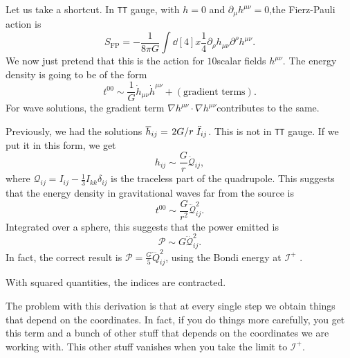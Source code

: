 Let us take a shortcut. In \texttt{TT} gauge, with $h = 0$ and $\partial_{\mu} h^{\mu\nu} = 0$,the Fierz-Pauli action is 
\begin{equation}
  S_{\text{FP}} = -\frac{1}{8 \pi G} \int \dd[4]{x} \frac{1}{4} \partial_{\rho} h_{\mu\nu} \partial^{\rho} h^{\mu\nu}.
\end{equation}
We now just pretend that this is the action for $10$scalar fields $h^{\mu\nu}$.
The energy density is going to be of the form
\begin{equation}
  t^{00} \sim \frac{1}{G} \dot{h}_{\mu\nu} \dot{h}^{\mu\nu} + (\text{gradient terms}).
\end{equation}
For wave solutions, the gradient term $\nabla h^{\mu\nu} \cdot \nabla h^{\mu\nu}$contributes to the same.

Previously, we had the solutions $\overline{h}_{ij} = \flatfrac{2G}{r} \ddot{I}_{ij}$. This is not in \texttt{TT} gauge. If we put it in this form, we get
\begin{equation}
  h_{ij} \sim \frac{G}{r} \ddot{\mathcal{Q}}_{ij},
\end{equation}
where $\mathcal{Q}_{ij} = I_{ij} - \frac{1}{3} I_{kk} \delta_{ij}$ is the traceless part of the quadrupole.
This suggests that the energy density in gravitational waves far from the source is
\begin{equation}
  t^{00} \sim \frac{G}{r^2} \dddot{\mathcal{Q}}_{ij}^2.
\end{equation}
Integrated over a sphere, this suggests that the power emitted is
\begin{equation}
  \mathcal{P} \sim G \dddot{\mathcal{Q}}^2_{ij}.
\end{equation}
In fact, the correct result is $\mathcal{P} = \frac{G}{5} \dddot{Q}^2_{ij}$, using the Bondi energy at $\mathscr{I}^+$ .
\begin{leftbar}
  \begin{note}
    With squared quantities, the indices are contracted.
  \end{note}
\end{leftbar}

\begin{remark}
  The problem with this derivation is that at every single step we obtain things that depend on the coordinates.
  In fact, if you do things more carefully, you get this term and a bunch of other stuff that depends on the coordinates we are working with. This other stuff vanishes when you take the limit to $\mathscr{I}^+$.
\end{remark}

